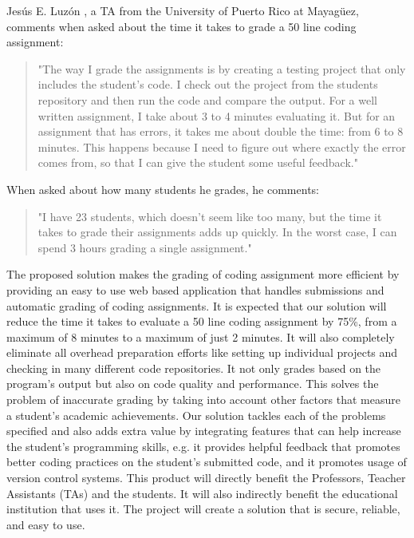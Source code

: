 Jesús E. Luzón \cite{Chiki}, a TA from the University of Puerto Rico at
Mayagüez, comments when asked about the time it takes to grade a 50 line coding
assignment: \begin{quote} "The way I grade the assignments is by creating a
testing project that only includes the student's code. I check out the project
from the students repository and then run the code and compare the output. For a
well written assignment, I take about 3 to 4 minutes evaluating it. But for an
assignment that has errors, it takes me about double the time: from 6 to 8
minutes. This happens because I need to figure out where exactly the error comes
from, so that I can give the student some useful feedback." \end{quote} When
asked about how many students he grades, he comments: \begin{quote} "I have 23
students, which doesn't seem like too many, but the time it takes to grade their
assignments adds up quickly. In the worst case, I can spend 3 hours grading a
single assignment." \end{quote}


The proposed solution makes the grading of coding assignment more efficient by
providing an easy to use web based application that handles submissions and
automatic grading of coding assignments. It is expected that our solution will
reduce the time it takes to evaluate a 50 line coding assignment by 75\%, from a
maximum of 8 minutes to a maximum of just 2 minutes. It will also completely
eliminate all overhead preparation efforts like setting up individual projects
and checking in many different code repositories. It not only grades based on
the program's output but also on code quality and performance. This solves the
problem of inaccurate grading by taking into account other factors that measure
a student's academic achievements. Our solution tackles each of the problems
specified and also adds extra value by integrating features that can help
increase the student's programming skills, e.g. it provides helpful feedback
that promotes better coding practices on the student's submitted code, and it
promotes usage of version control systems. This product will directly benefit
the Professors, Teacher Assistants (TAs) and the students. It will also
indirectly benefit the educational institution that uses it. The project will
create a solution that is secure, reliable, and easy to use.

